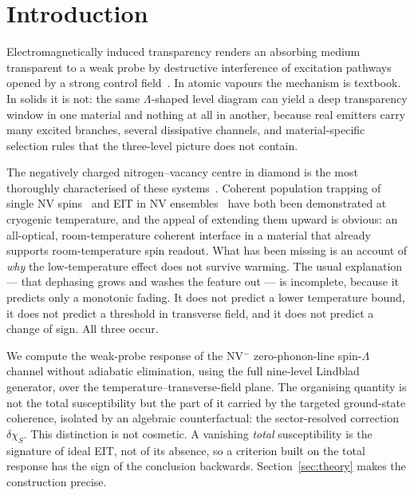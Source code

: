 \documentclass[
  reprint,
  amsmath,amssymb,
  aps,pra,
  superscriptaddress,
  floatfix,
]{revtex4-2}
\newcommand{\dchi}{\delta\chi_{S}}
\begin{document}
\section{Introduction}

Electromagnetically induced transparency renders an absorbing medium
transparent to a weak probe by destructive interference of excitation
pathways opened by a strong control field~\cite{M2005C01}. In atomic vapours
the mechanism is textbook. In solids it is not: the same $\Lambda$-shaped
level diagram can yield a deep transparency window in one material and
nothing at all in another, because real emitters carry many excited branches,
several dissipative channels, and material-specific selection rules that the
three-level picture does not contain.

The negatively charged nitrogen--vacancy centre in diamond is the most
thoroughly characterised of these systems~\cite{M2013S07}. Coherent population
trapping of single NV spins~\cite{C2006S02} and EIT in NV
ensembles~\cite{V2013S01} have both been demonstrated at cryogenic
temperature, and the appeal of extending them upward is obvious: an
all-optical, room-temperature coherent interface in a material that already
supports room-temperature spin readout. What has been missing is an account
of \emph{why} the low-temperature effect does not survive warming. The usual
explanation --- that dephasing grows and washes the feature out --- is
incomplete, because it predicts only a monotonic fading. It does not predict
a lower temperature bound, it does not predict a threshold in transverse
field, and it does not predict a change of sign. All three occur.

We compute the weak-probe response of the NV$^{-}$ zero-phonon-line
spin-$\Lambda$ channel without adiabatic elimination, using the full
nine-level Lindblad generator, over the temperature--transverse-field plane.
The organising quantity is not the total susceptibility but the part of it
carried by the targeted ground-state coherence, isolated by an algebraic
counterfactual: the sector-resolved correction $\dchi$. This distinction is
not cosmetic. A vanishing \emph{total} susceptibility is the signature of
ideal EIT, not of its absence, so a criterion built on the total response has
the sign of the conclusion backwards. Section~\ref{sec:theory} makes the
construction precise.
\end{document}
